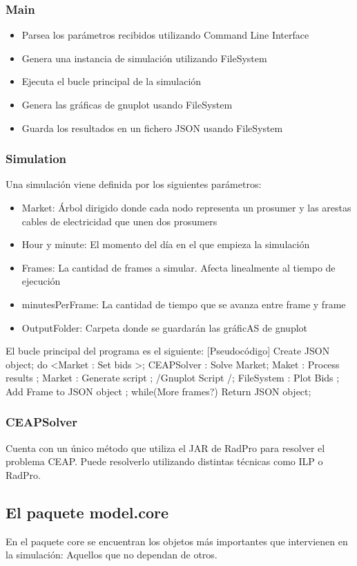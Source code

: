 \documentclass[12pt,a4paper,openright,oneside]{article}
\numberwithin{equation}{section}
\theoremstyle{definition}
\begin{document}
\subsubsection{Main}
\begin{itemize}
\item Parsea los parámetros recibidos utilizando Command Line Interface
\item Genera una instancia de simulación utilizando FileSystem
\item Ejecuta el bucle principal de la simulación
\item Genera las gráficas de gnuplot usando FileSystem
\item Guarda los resultados en un fichero JSON usando FileSystem
\end{itemize}
\subsubsection{Simulation}
Una simulación viene definida por los siguientes parámetros:
\begin{itemize}
\item Market: Árbol dirigido donde cada nodo representa un prosumer y las arestas cables de electricidad que unen dos prosumers
\item Hour y minute: El momento del día en el que empieza la simulación
\item Frames: La cantidad de frames a simular. Afecta linealmente al tiempo de ejecución
\item minutesPerFrame: La cantidad de tiempo que se avanza entre frame y frame
\item OutputFolder: Carpeta donde se guardarán las gráficAS de gnuplot
\end{itemize}
El bucle principal del programa es el siguiente:
[Pseudocódigo]
Create JSON object;
do
{
  <Market : Set bids    >;
  CEAPSolver : Solve Market;
  Maket : Process results  ;
  Market : Generate script ;
  /Gnuplot Script         /;
  FileSystem : Plot Bids   ;
  Add Frame to JSON object ;
}while(More frames?)
Return JSON object;




\subsubsection{CEAPSolver}
Cuenta con un único método que utiliza el JAR de RadPro para resolver el problema CEAP. Puede resolverlo utilizando distintas técnicas como ILP o RadPro.

\subsection{El paquete model.core}
En el paquete core se encuentran los objetos más importantes que intervienen en la simulación: Aquellos que no dependan de otros.
\end{document}
